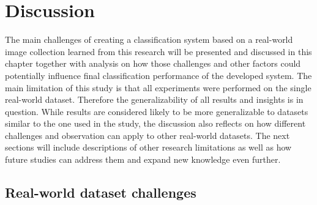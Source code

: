 \chapter{Discussion}
\label{chap:discussion}
The main challenges of creating a classification system based on a real-world image collection learned from this research will be presented and discussed in this chapter together with analysis on how those challenges and other factors could potentially influence final classification performance of the developed system. The main limitation of this study is that all experiments were performed on the single real-world dataset. Therefore the generalizability of all results and insights is in question. While results are considered likely to be more generalizable to datasets similar to the one used in the study, the discussion also reflects on how different challenges and observation can apply to other real-world datasets. The next sections will include descriptions of other research limitations as well as how future studies can address them and expand new knowledge even further.

\section{Real-world dataset challenges}
\label{sec:real-world-dataset-challenges}

